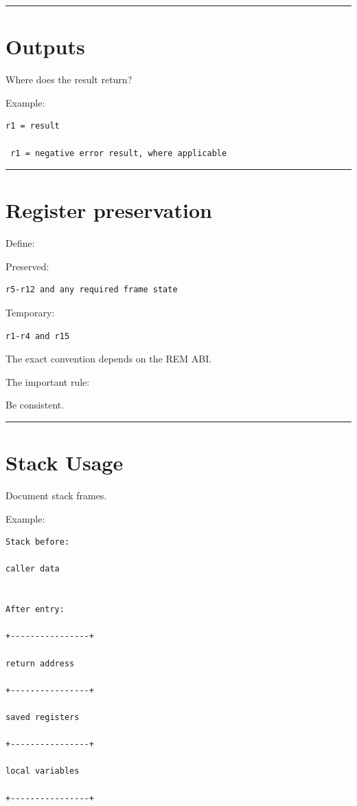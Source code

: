 \documentclass[
  oneside,
  openany]{book}
\begin{document}
\begin{center}\rule{0.5\linewidth}{0.5pt}\end{center}

\hypertarget{outputs-1}{%
\section{Outputs}\label{outputs-1}}

Where does the result return?

Example:

\begin{verbatim}
r1 = result

 r1 = negative error result, where applicable
\end{verbatim}

\begin{center}\rule{0.5\linewidth}{0.5pt}\end{center}

\hypertarget{register-preservation-1}{%
\section{Register preservation}\label{register-preservation-1}}

Define:

Preserved:

\begin{verbatim}
r5-r12 and any required frame state
\end{verbatim}

Temporary:

\begin{verbatim}
r1-r4 and r15
\end{verbatim}

The exact convention depends on the REM ABI.

The important rule:

Be consistent.

\begin{center}\rule{0.5\linewidth}{0.5pt}\end{center}

\hypertarget{stack-usage-1}{%
\section{Stack Usage}\label{stack-usage-1}}

Document stack frames.

Example:

\begin{verbatim}
Stack before:

caller data


After entry:

+----------------+

return address

+----------------+

saved registers

+----------------+

local variables

+----------------+
\end{verbatim}
\end{document}
